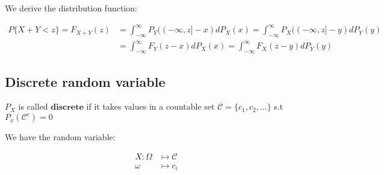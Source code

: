 We derive the distribution function:

\begin{align*}
P\{X+Y < z\} = F_{X+Y}(z) &= \int_{-\infty}^{\infty} P_Y((-\infty, z] - x) dP_X(x) = \int_{-\infty}^{\infty} P_X((-\infty, z] - y) dP_Y(y) \\
&= \int_{-\infty}^{\infty} F_Y(z - x) dP_X(x) = \int_{-\infty}^{\infty} F_X(z - y) dP_Y(y)
\end{align*}


\subsection*{Discrete random variable}

$P_X$ is called $\textbf{discrete}$ if it  takes values in a countable set $\mathcal{C} = \{c_1,c_2,\dots\}$ s.t $P_x(\mathcal{C}^c) = 0$

We have the random variable: 

\begin{align*}
X : \Omega &\longmapsto \mathcal{C} \\
\omega &\longmapsto c_i
\end{align*}

